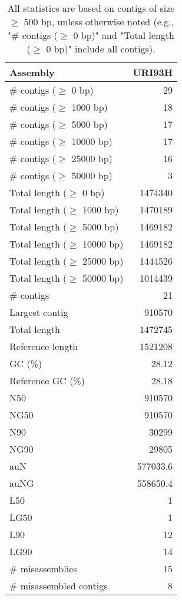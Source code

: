 \documentclass[12pt,a4paper]{article}
\begin{document}
\begin{table}[ht]
\begin{center}
\caption{All statistics are based on contigs of size $\geq$ 500 bp, unless otherwise noted (e.g., "\# contigs ($\geq$ 0 bp)" and "Total length ($\geq$ 0 bp)" include all contigs).}
\begin{tabular}{|l*{1}{|r}|}
\hline
Assembly & URI93H \\ \hline
\# contigs ($\geq$ 0 bp) & 29 \\ \hline
\# contigs ($\geq$ 1000 bp) & 18 \\ \hline
\# contigs ($\geq$ 5000 bp) & 17 \\ \hline
\# contigs ($\geq$ 10000 bp) & 17 \\ \hline
\# contigs ($\geq$ 25000 bp) & 16 \\ \hline
\# contigs ($\geq$ 50000 bp) & 3 \\ \hline
Total length ($\geq$ 0 bp) & 1474340 \\ \hline
Total length ($\geq$ 1000 bp) & 1470189 \\ \hline
Total length ($\geq$ 5000 bp) & 1469182 \\ \hline
Total length ($\geq$ 10000 bp) & 1469182 \\ \hline
Total length ($\geq$ 25000 bp) & 1444526 \\ \hline
Total length ($\geq$ 50000 bp) & 1014439 \\ \hline
\# contigs & 21 \\ \hline
Largest contig & 910570 \\ \hline
Total length & 1472745 \\ \hline
Reference length & 1521208 \\ \hline
GC (\%) & 28.12 \\ \hline
Reference GC (\%) & 28.18 \\ \hline
N50 & 910570 \\ \hline
NG50 & 910570 \\ \hline
N90 & 30299 \\ \hline
NG90 & 29805 \\ \hline
auN & 577033.6 \\ \hline
auNG & 558650.4 \\ \hline
L50 & 1 \\ \hline
LG50 & 1 \\ \hline
L90 & 12 \\ \hline
LG90 & 14 \\ \hline
\# misassemblies & 15 \\ \hline
\# misassembled contigs & 8 \\ \hline

\end{tabular}
\end{center}
\end{table}
\end{document}
